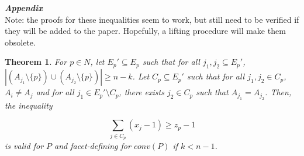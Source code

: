 \documentclass[12pt]{article}
\newcommand{\lp}{\left(}
\newcommand{\rp}{\right)}
\newcommand{\sm}{\setminus}
\newcommand{\subheading}[1]{\emph{\textbf{#1}}}
\newtheorem{thm}{Theorem}
\begin{document}



\subheading{Appendix}\\

Note: the proofs for these inequalities seem to work, but still need to be verified if they will be added to the paper. Hopefully, a lifting procedure will make them obsolete.

\begin{thm}
For $p \in N$, let $E_p' \subseteq E_p$ such that for all $j_1,j_2 \subseteq E_p'$, $|(A_{j_1} \sm \{p\}) \cup (A_{j_2} \sm \{p\})| \geq n-k$. Let $C_p \subseteq E_p'$ such that for all $j_1,j_2 \in C_p$, $A_i \neq A_j$ and for all $j_1 \in E_p' \sm C_p$, there exists $j_2 \in C_p$ such that $A_{j_1} = A_{j_2}$. Then, the inequality

\begin{equation}
\sum_{j \in C_p} \lp x_j - 1 \rp \geq z_p - 1
\label{eq:vi2}
\end{equation}
is valid for $P$ and facet-defining for $conv(P)$ if $k < n-1$.
\end{thm}
\end{document}
